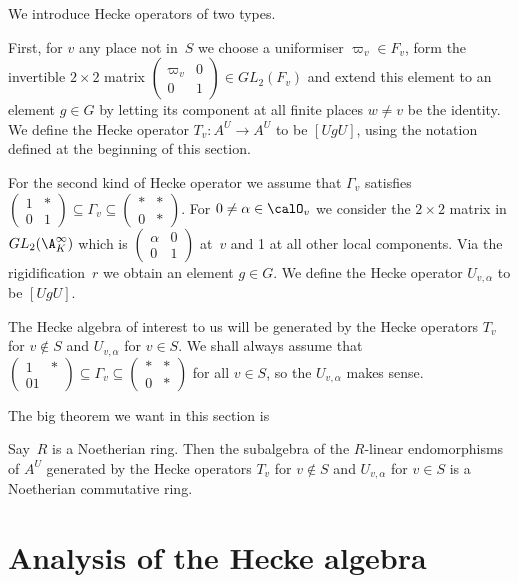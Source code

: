 We introduce Hecke operators of two types.

First, for $v$ any place not in~$S$ we choose a uniformiser $\varpi_v\in F_v$,
form the invertible $2\times 2$ matrix $\begin{pmatrix}\varpi_v&0\\0&1\end{pmatrix}\in GL_2(F_v)$
and extend this element to an element $g\in G$ by letting its component at all finite places
$w\not=v$ be the identity. We define the Hecke operator $T_v:A^U\to A^U$ to be $[UgU]$, using the
notation defined at the beginning of this section.

For the second kind of Hecke operator we assume that $\Gamma_v$ satisfies
$\begin{pmatrix}1&*\\0&1\end{pmatrix}\subseteq\Gamma_v\subseteq\begin{pmatrix}*&*\\0&*\end{pmatrix}$.
For $0\not=\alpha\in\calO_v$ we consider the $2\times 2$ matrix in $GL_2(\A_K^\infty)$
which is $\begin{pmatrix}\alpha&0\\0&1\end{pmatrix}$ at~$v$ and 1 at all other local components.
Via the rigidification~$r$ we obtain an element $g\in G$.
We define the Hecke operator $U_{v,\alpha}$ to be $[UgU]$.

The Hecke algebra of interest to us will be generated by the Hecke operators $T_v$ for $v\notin S$
and $U_{v,\alpha}$ for $v\in S$. We shall always assume that
$\begin{pmatrix}1&*\\01\end{pmatrix}\subseteq\Gamma_v\subseteq\begin{pmatrix}*&*\\0&*\end{pmatrix}$
for all $v\in S$, so the $U_{v,\alpha}$ makes sense.

The big theorem we want in this section is

\begin{theorem} Say~$R$ is a Noetherian ring. Then the subalgebra of the $R$-linear endomorphisms
  of $A^U$ generated by the Hecke operators $T_v$ for $v\notin S$ and $U_{v,\alpha}$ for $v\in S$
  is a Noetherian commutative ring.
\end{theorem}

\section{Analysis of the Hecke algebra}

